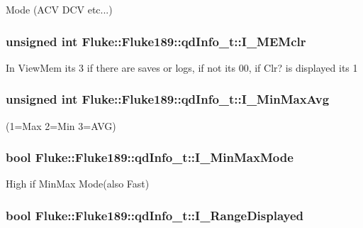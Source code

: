 \label{structFluke_1_1Fluke189_1_1qdInfo__t_a9ecea1a82c8e2cd052fd255bebbc6242}
Mode (ACV DCV etc...) \hypertarget{structFluke_1_1Fluke189_1_1qdInfo__t_a043370629d1031b73e2a9c5ab6bfe3ed}{
\subsubsection[{I\_\-MEMclr}]{\setlength{\rightskip}{0pt plus 5cm}unsigned int {\bf Fluke::Fluke189::qdInfo\_\-t::I\_\-MEMclr}}}
\label{structFluke_1_1Fluke189_1_1qdInfo__t_a043370629d1031b73e2a9c5ab6bfe3ed}
In ViewMem its 3 if there are saves or logs, if not its 00, if Clr? is displayed its 1 \hypertarget{structFluke_1_1Fluke189_1_1qdInfo__t_ae906425b9f885f10a8eacee025cd969c}{
\subsubsection[{I\_\-MinMaxAvg}]{\setlength{\rightskip}{0pt plus 5cm}unsigned int {\bf Fluke::Fluke189::qdInfo\_\-t::I\_\-MinMaxAvg}}}
\label{structFluke_1_1Fluke189_1_1qdInfo__t_ae906425b9f885f10a8eacee025cd969c}
(1=Max 2=Min 3=AVG) \hypertarget{structFluke_1_1Fluke189_1_1qdInfo__t_a5d59e161cce6a005a7b0e0443abdc01e}{
\subsubsection[{I\_\-MinMaxMode}]{\setlength{\rightskip}{0pt plus 5cm}bool {\bf Fluke::Fluke189::qdInfo\_\-t::I\_\-MinMaxMode}}}
\label{structFluke_1_1Fluke189_1_1qdInfo__t_a5d59e161cce6a005a7b0e0443abdc01e}
High if MinMax Mode(also Fast) \hypertarget{structFluke_1_1Fluke189_1_1qdInfo__t_a3655a4961481c568f66253ed879f0b8c}{
\subsubsection[{I\_\-RangeDisplayed}]{\setlength{\rightskip}{0pt plus 5cm}bool {\bf Fluke::Fluke189::qdInfo\_\-t::I\_\-RangeDisplayed}}}
